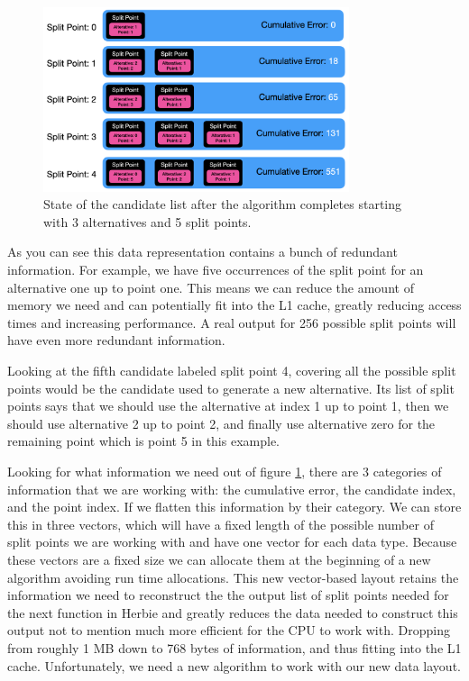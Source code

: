 \documentclass{article}
\begin{document}
\begin{figure}[htbp]
\begin{center}
\includegraphics[width=0.8\textwidth]{candidate-list.png}
\caption{State of the candidate list after the algorithm completes starting with 3 alternatives and 5 split points.}
\label{fig:candidate-list} 
\end{center}
\end{figure}

As you can see this data representation contains a bunch of redundant information. For example, we have five occurrences of the split point for an alternative one up to point one. This means we can reduce the amount of memory we need and can potentially fit into the L1 cache, greatly reducing access times and increasing performance. A real output for 256 possible split points will have even more redundant information.

Looking at the fifth candidate labeled split point 4, covering all the possible split points would be the candidate used to generate a new alternative. Its list of split points says that we should use the alternative at index 1 up to point 1, then we should use alternative 2 up to point 2, and finally use alternative zero for the remaining point which is point 5 in this example. 

Looking for what information we need out of figure \ref{fig:candidate-list}, there are 3 categories of information that we are working with: the cumulative error, the candidate index, and the point index. If we flatten this information by their category. We can store this in three vectors, which will have a fixed length of the possible number of split points we are working with and have one vector for each data type. Because these vectors are a fixed size we can allocate them at the beginning of a new algorithm avoiding run time allocations. This new vector-based layout retains the information we need to reconstruct the the output list of split points needed for the next function in Herbie and greatly reduces the data needed to construct this output not to mention much more efficient for the CPU to work with. Dropping from roughly 1 MB down to 768 bytes of information, and thus fitting into the L1 cache. 
Unfortunately, we need a new algorithm to work with our new data layout.
\end{document}

